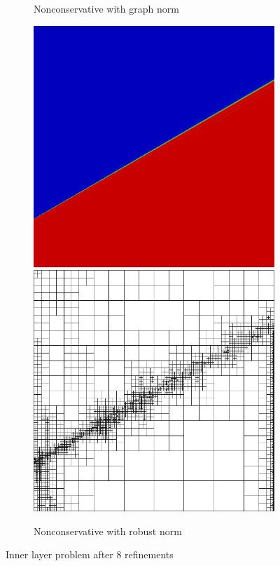 \documentclass[letterpaper]{article}
\begin{document}
\begin{figure}
\begin{subfigure}[t]{0.45\textwidth}
\caption{Nonconservative with graph norm}
\label{fig:innerlayerGraph18nc}
\end{subfigure}
\begin{subfigure}[t]{0.45\textwidth}
\centering
\includegraphics[width=\textwidth]{figs/InnerLayer/robust8nc.png}
\includegraphics[width=\textwidth]{figs/InnerLayer/robust8nc_mesh.png}
\caption{Nonconservative with robust norm}
\label{fig:innerlayerRobust18nc}
\end{subfigure}
\caption{Inner layer problem after 8 refinements}
\label{fig:innerlayer8nc}
\end{figure}
\end{document}
